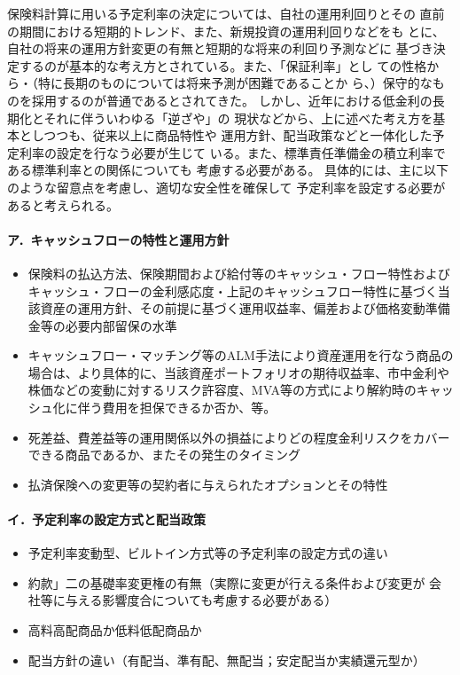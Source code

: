 \documentclass[report,gutter=10mm,fore-edge=10mm,uplatex,dvipdfmx]{jlreq}
\begin{document}

保険料計算に用いる予定利率の決定については、自社の運用利回りとその
直前の期間における短期的トレンド、また、新規投資の運用利回りなどをも
とに、自社の将来の運用方針変更の有無と短期的な将来の利回り予測などに
基づき決定するのが基本的な考え方とされている。また、「保証利率」とし
ての性格から・（特に長期のものについては将来予測が困難であることか
ら、）保守的なものを採用するのが普通であるとされてきた。
しかし、近年における低金利の長期化とそれに伴ういわゆる「逆ざや」の
現状などから、上に述べた考え方を基本としつつも、従来以上に商品特性や
運用方針、配当政策などと一体化した予定利率の設定を行なう必要が生じて
いる。また、標準責任準備金の積立利率である標準利率との関係についても
考慮する必要がある。
具体的には、主に以下のような留意点を考慮し、適切な安全性を確保して
予定利率を設定する必要があると考えられる。

\paragraph{ア．キャッシュフローの特性と運用方針}

\begin{itemize}
 \item 保険料の払込方法、保険期間および給付等のキャッシュ・フロー特性およびキャッシュ・フローの金利感応度・上記のキャッシュフロー特性に基づく当該資産の運用方針、その前提に基づく運用収益率、偏差および価格変動準備金等の必要内部留保の水準
 \item キャッシュフロー・マッチング等のALM手法により資産運用を行なう商品の場合は、より具体的に、当該資産ポートフォリオの期待収益率、市中金利や株価などの変動に対するリスク許容度、MVA等の方式により解約時のキャッシュ化に伴う費用を担保できるか否か、等。
 \item 死差益、費差益等の運用関係以外の損益によりどの程度金利リスクをカバーできる商品であるか、またその発生のタイミング
 \item 払済保険への変更等の契約者に与えられたオプションとその特性
\end{itemize}
\paragraph{イ．予定利率の設定方式と配当政策}
\begin{itemize}
 \item 予定利率変動型、ビルトイン方式等の予定利率の設定方式の違い
 \item 約款」二の基礎率変更権の有無（実際に変更が行える条件および変更が
会社等に与える影響度合についても考慮する必要がある）
 \item 高料高配商品か低料低配商品か
 \item 配当方針の違い（有配当、準有配、無配当；安定配当か実績還元型か）
\end{itemize}
\end{document}
